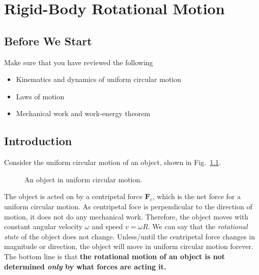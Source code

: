 %
%
%
\chapter{Rigid-Body Rotational Motion}
%
%

\section*{Before We Start}
Make sure that you have reviewed the following
\begin{itemize}
\item Kinematics and dynamics of uniform circular motion
\item Laws of motion 
\item Mechanical work and work-energy theorem
\end{itemize}


\section{Introduction}

Consider the uniform circular motion of an object, shown in
Fig.~\ref{fig:uniform-circ-motion}.
\begin{figure}[ht]
  \centering
  \caption{An object in uniform circular motion.}
  \label{fig:uniform-circ-motion}
\end{figure}
The object is acted on by a centripetal force $\bm F_c$, which is the net force
for a uniform circular motion. As centripetal foce is perpendicular to the
direction of motion, it does not do any mechanical work. Therefore, the object
moves with constant angular velocity $\omega$ and speed $v=\omega R$. We can
say that the \emph{rotational state} of the object does not change.
Unless/until the centripetal force changes in magnitude or direction, the
object will move in uniform circular motion forever. The bottom line is that
\textbf{the rotational motion of an object is not determined \emph{only} by
  what forces are acting it.}



